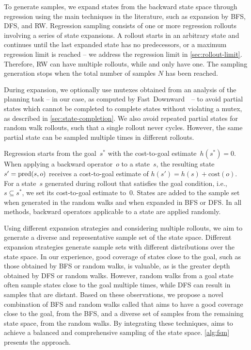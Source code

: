 To generate samples, we expand states from the backward state space through regression using the main techniques in the literature, such as expansion by BFS, DFS, and RW. Regression sampling consists of one or more regression rollouts involving a series of state expansions. A rollout starts in an arbitrary state and continues until the last expanded state has no predecessors, or a maximum regression limit is reached -- we address the regression limit in \cref{sec:rollout-limit}. Therefore, RW can have multiple rollouts, while \bfs and \dfs only have one. The sampling generation stops when the total number of samples $N$ has been reached.

During expansion, we optionally use mutexes obtained from an analysis of the planning task -- in our case, as computed by Fast~Downward~\cite{helmert2006fast}~-- to avoid partial states which cannot be completed to complete states without violating a mutex, as described in \cref{sec:state-completion}. We also avoid repeated partial states for random walk rollouts, such that a single rollout never cycles. However, the same partial state can be sampled multiple times in different rollouts.

Regression starts from the goal~$s^*$ with the cost-to-goal estimate~$h(s^*)=0$. When applying a backward operator~$o$ to a state~$s$, the resulting state~$s' = \operatorname{pred}(s, o)$ receives a cost-to-goal estimate of $h(s') = h(s) + \text{cost}(o)$. For a state~$s$ generated during rollout that satisfies the goal condition, i.e.,~$s \subseteq s^*$, we set its cost-to-goal estimate to~$0$. States are added to the sample set when generated in the random walks and when expanded in BFS or DFS. In all methods, backward operators applicable to a state are applied randomly.

Using different expansion strategies and considering multiple rollouts, we aim to generate a diverse and representative sample set of the state space. Different expansion strategies generate sample sets with different distributions over the state space. In our experience, good coverage of states close to the goal, such as those obtained by BFS or random walks, is valuable, as is the greater depth obtained by DFS or random walks. However, random walks from a goal state often sample states close to the goal multiple times, while DFS can result in samples that are distant. Based on these observations, we propose a novel combination of BFS and random walks called \bfsrw that aims to have a good coverage close to the goal, from the BFS, and a diverse set of samples from the remaining state space, from the random walks. By integrating these techniques, \bfsrw aims to achieve a balanced and comprehensive sampling of the state space. \cref{alg:fsm} presents the approach.

